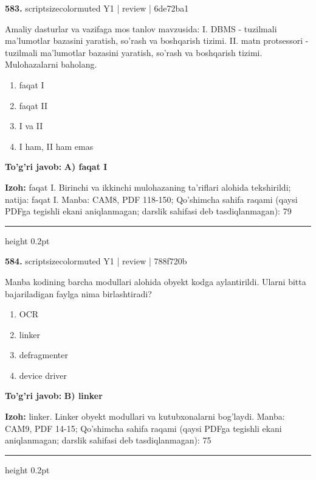 \documentclass[10pt,a4paper]{article}
\begin{document}
{\bfseries\sffamily\color{ink} 583.} {scriptsizecolor{muted} Y1 | review | 6de72ba1}
\par
Amaliy dasturlar va vazifaga mos tanlov mavzusida: I. DBMS - tuzilmali ma'lumotlar bazasini yaratish, so'rash va boshqarish tizimi. II. matn protsessori - tuzilmali ma'lumotlar bazasini yaratish, so'rash va boshqarish tizimi. Mulohazalarni baholang.
\begin{enumerate}[label=\Alph*),leftmargin=9mm]
\item faqat I
\item faqat II
\item I va II
\item I ham, II ham emas
\end{enumerate}
\begin{tcolorbox}[enhanced,breakable,colback=teal!4,colframe=teal!60!black,boxrule=0.45pt,arc=1.2mm,left=2.7mm,right=2.7mm,top=1.8mm,bottom=1.8mm,before skip=2mm,after skip=2mm]
{\bfseries\sffamily\color{teal}To'g'ri javob:} \textbf{A) faqat I}
\par\smallskip
{\bfseries Izoh:} faqat I. Birinchi va ikkinchi mulohazaning ta'riflari alohida tekshirildi; natija: faqat I. Manba: CAM8, PDF 118-150; Qo'shimcha sahifa raqami (qaysi PDFga tegishli ekani aniqlanmagan; darslik sahifasi deb tasdiqlanmagan): 79
\end{tcolorbox}
\vspace{2mm}\hrule height 0.2pt\vspace{3mm}

{\bfseries\sffamily\color{ink} 584.} {scriptsizecolor{muted} Y1 | review | 788f720b}
\par
Manba kodining barcha modullari alohida obyekt kodga aylantirildi. Ularni bitta bajariladigan faylga nima birlashtiradi?
\begin{enumerate}[label=\Alph*),leftmargin=9mm]
\item OCR
\item linker
\item defragmenter
\item device driver
\end{enumerate}
\begin{tcolorbox}[enhanced,breakable,colback=teal!4,colframe=teal!60!black,boxrule=0.45pt,arc=1.2mm,left=2.7mm,right=2.7mm,top=1.8mm,bottom=1.8mm,before skip=2mm,after skip=2mm]
{\bfseries\sffamily\color{teal}To'g'ri javob:} \textbf{B) linker}
\par\smallskip
{\bfseries Izoh:} linker. Linker obyekt modullari va kutubxonalarni bog'laydi. Manba: CAM9, PDF 14-15; Qo'shimcha sahifa raqami (qaysi PDFga tegishli ekani aniqlanmagan; darslik sahifasi deb tasdiqlanmagan): 75
\end{tcolorbox}
\vspace{2mm}\hrule height 0.2pt\vspace{3mm}
\end{document}
